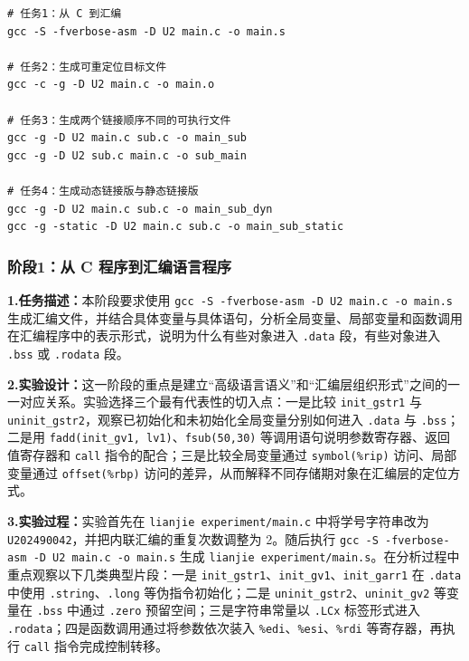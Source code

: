\documentclass[supercite]{Experimental_Report}
\theoremstyle{definition}
\begin{document}
\begin{lstlisting}[language=Shell, caption={实验5中统一使用的典型编译命令}, label={lst:lab5-build}]
# 任务1：从 C 到汇编
gcc -S -fverbose-asm -D U2 main.c -o main.s

# 任务2：生成可重定位目标文件
gcc -c -g -D U2 main.c -o main.o

# 任务3：生成两个链接顺序不同的可执行文件
gcc -g -D U2 main.c sub.c -o main_sub
gcc -g -D U2 sub.c main.c -o sub_main

# 任务4：生成动态链接版与静态链接版
gcc -g -D U2 main.c sub.c -o main_sub_dyn
gcc -g -static -D U2 main.c sub.c -o main_sub_static
\end{lstlisting}

\subsubsection{阶段1：从 C 程序到汇编语言程序}
\noindent\textbf{1.任务描述：}本阶段要求使用 \texttt{gcc -S -fverbose-asm -D U2 main.c -o main.s} 生成汇编文件，并结合具体变量与具体语句，分析全局变量、局部变量和函数调用在汇编程序中的表示形式，说明为什么有些对象进入 \texttt{.data} 段，有些对象进入 \texttt{.bss} 或 \texttt{.rodata} 段。

\noindent\textbf{2.实验设计：}这一阶段的重点是建立“高级语言语义”和“汇编层组织形式”之间的一一对应关系。实验选择三个最有代表性的切入点：一是比较 \texttt{init\_gstr1} 与 \texttt{uninit\_gstr2}，观察已初始化和未初始化全局变量分别如何进入 \texttt{.data} 与 \texttt{.bss}；二是用 \texttt{fadd(init\_gv1, lv1)}、\texttt{fsub(50,30)} 等调用语句说明参数寄存器、返回值寄存器和 \texttt{call} 指令的配合；三是比较全局变量通过 \texttt{symbol(\%rip)} 访问、局部变量通过 \texttt{offset(\%rbp)} 访问的差异，从而解释不同存储期对象在汇编层的定位方式。

\noindent\textbf{3.实验过程：}实验首先在 \texttt{lianjie experiment/main.c} 中将学号字符串改为 \texttt{U202490042}，并把内联汇编的重复次数调整为 2。随后执行 \texttt{gcc -S -fverbose-asm -D U2 main.c -o main.s} 生成 \texttt{lianjie experiment/main.s}。在分析过程中重点观察以下几类典型片段：一是 \texttt{init\_gstr1}、\texttt{init\_gv1}、\texttt{init\_garr1} 在 \texttt{.data} 中使用 \texttt{.string}、\texttt{.long} 等伪指令初始化；二是 \texttt{uninit\_gstr2}、\texttt{uninit\_gv2} 等变量在 \texttt{.bss} 中通过 \texttt{.zero} 预留空间；三是字符串常量以 \texttt{.LCx} 标签形式进入 \texttt{.rodata}；四是函数调用通过将参数依次装入 \texttt{\%edi}、\texttt{\%esi}、\texttt{\%rdi} 等寄存器，再执行 \texttt{call} 指令完成控制转移。
\end{document}
